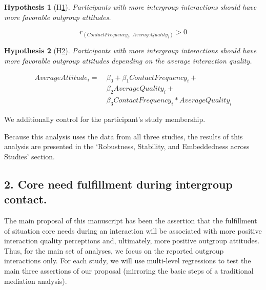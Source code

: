\documentclass[man, 12pt, a4paper, mask]{apa7}
\theoremstyle{break}
\theoremstyle{plain}
\newtheorem{subhyp}{Hypothesis}
\begin{document}
\begin{mdframed}[style=mdfhypothesis]
    \begin{subhyp}[H\ref{hyp:contactCor}] \label{hyp:contactCor}
    \addtolength{\leftskip}{\subhypskip}
    Participants with more intergroup interactions should have more favorable outgroup attitudes.
    \end{subhyp}

      \begin{fleqn}[\eqskip] 
        \begin{equation} \label{eq:ContactCor}
            r_{\left(ContactFrequency_{i},\ AverageQuality_{i}\right)} > 0
        \end{equation}
      \end{fleqn}

    \begin{subhyp}[H\ref{hyp:contactQualLM}] \label{hyp:contactQualLM}
    \addtolength{\leftskip}{\subhypskip}
    Participants with more intergroup interactions should have more favorable outgroup attitudes depending on the average interaction quality.
    \end{subhyp}

      \begin{fleqn}[\eqskip] 
        \begin{equation} \label{eq:contactQualLM}
            \begin{split}
              AverageAttitude_{i} = &\ \beta_{0} + \beta_{1}ContactFrequency_{i} + \\
                                    &\ \beta_{2}AverageQuality_{i} +\\
                                    &\ \beta_{3}ContactFrequency_{i} * AverageQuality_{i}
            \end{split}
        \end{equation}
      \end{fleqn}  

      We additionally control for the participant's study membership.
\end{mdframed}
Because this analysis uses the data from all three studies, the results of this analysis are presented in the `Robustness, Stability, and Embeddedness across Studies' section.

\subsection{2. Core need fulfillment during intergroup contact.}
The main proposal of this manuscript has been the assertion that the fulfillment of situation core needs during an interaction will be associated with more positive interaction quality perceptions and, ultimately, more positive outgroup attitudes. Thus, for the main set of analyses, we focus on the reported outgroup interactions only. For each study, we will use multi-level regressions to test the main three assertions of our proposal (mirroring the basic steps of a traditional mediation analysis).
\end{document}
